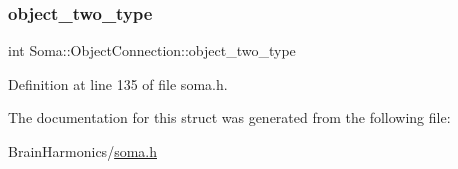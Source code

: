 \subsubsection{\texorpdfstring{object\+\_\+two\+\_\+type}{object\_two\_type}}
{\footnotesize\ttfamily int Soma\+::\+Object\+Connection\+::object\+\_\+two\+\_\+type}



Definition at line 135 of file soma.\+h.



The documentation for this struct was generated from the following file\+:\begin{DoxyCompactItemize}
\item 
Brain\+Harmonics/\hyperlink{soma_8h}{soma.\+h}\end{DoxyCompactItemize}
